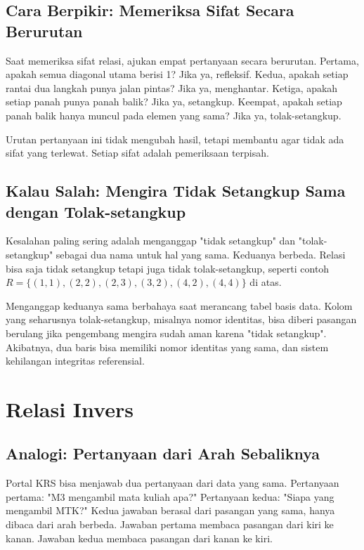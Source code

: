 \documentclass[11pt,a4paper]{article}
\begin{document}
\subsection{Cara Berpikir: Memeriksa Sifat Secara Berurutan}

Saat memeriksa sifat relasi, ajukan empat pertanyaan secara berurutan. Pertama, apakah semua diagonal utama berisi 1? Jika ya, refleksif. Kedua, apakah setiap rantai dua langkah punya jalan pintas? Jika ya, menghantar. Ketiga, apakah setiap panah punya panah balik? Jika ya, setangkup. Keempat, apakah setiap panah balik hanya muncul pada elemen yang sama? Jika ya, tolak-setangkup.

Urutan pertanyaan ini tidak mengubah hasil, tetapi membantu agar tidak ada sifat yang terlewat. Setiap sifat adalah pemeriksaan terpisah.

\subsection{Kalau Salah: Mengira Tidak Setangkup Sama dengan Tolak-setangkup}

Kesalahan paling sering adalah menganggap "tidak setangkup" dan "tolak-setangkup" sebagai dua nama untuk hal yang sama. Keduanya berbeda. Relasi bisa saja tidak setangkup tetapi juga tidak tolak-setangkup, seperti contoh $R=\{(1,1),(2,2),(2,3),(3,2),(4,2),(4,4)\}$ di atas.

Menganggap keduanya sama berbahaya saat merancang tabel basis data. Kolom yang seharusnya tolak-setangkup, misalnya nomor identitas, bisa diberi pasangan berulang jika pengembang mengira sudah aman karena "tidak setangkup". Akibatnya, dua baris bisa memiliki nomor identitas yang sama, dan sistem kehilangan integritas referensial.

\section{Relasi Invers}

\subsection{Analogi: Pertanyaan dari Arah Sebaliknya}

Portal KRS bisa menjawab dua pertanyaan dari data yang sama. Pertanyaan pertama: "M3 mengambil mata kuliah apa?" Pertanyaan kedua: "Siapa yang mengambil MTK?" Kedua jawaban berasal dari pasangan yang sama, hanya dibaca dari arah berbeda. Jawaban pertama membaca pasangan dari kiri ke kanan. Jawaban kedua membaca pasangan dari kanan ke kiri.
\end{document}
